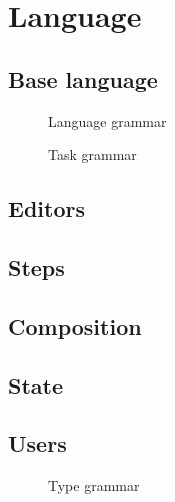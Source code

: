 


\section{Language}



\subsection{Base language}

\begin{figure}
  \caption{Language grammar} \label{fig:language-grammar}
\end{figure}

\begin{figure}
  \caption{Task grammar} \label{fig:task-grammar}
\end{figure}



\subsection{Editors}



\subsection{Steps}



\subsection{Composition}



\subsection{State}



\subsection{Users}


\begin{figure}
  \caption{Type grammar} \label{fig:type-grammar}
\end{figure}

